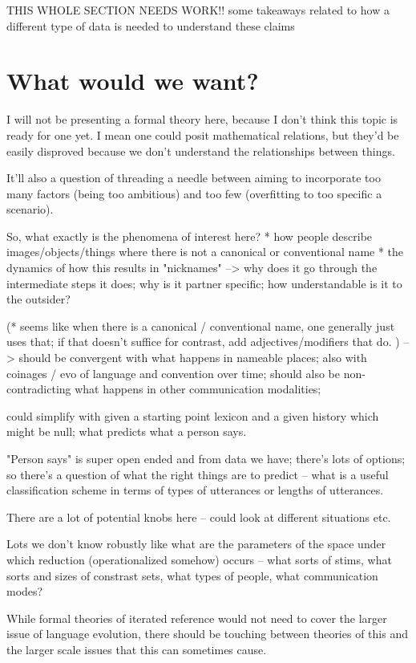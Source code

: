 \documentclass[]{article}
\begin{document}
THIS WHOLE SECTION NEEDS WORK!!
some takeaways related to how a different type of data is needed to understand these claims


	\section{What would we want?}
	
	I will not be presenting a formal theory here, because I don't think this topic is ready for one yet. I mean one could posit mathematical relations, but they'd be easily disproved because we don't understand the relationships between things. 
	
	It'll also a question of threading a needle between aiming to incorporate too many factors (being too ambitious) and too few (overfitting to too specific a scenario). 
	
	So, what exactly is the phenomena of interest here? 
	* how people describe images/objects/things where there is not a canonical or conventional name 
	* the dynamics of how this results in "nicknames" 
	--> why does it go through the intermediate steps it does; why is it partner specific; how understandable is it to the outsider? 
	
	(* seems like when there is a canonical / conventional name, one generally just uses that; if that doesn't suffice for contrast, add adjectives/modifiers that do. )
	-- > should be convergent with what happens in nameable places; also with coinages / evo of language and convention over time; should also be non-contradicting what happens in other communication modalities; 
	
	could simplify with given a starting point lexicon and a given history which might be null; what predicts what a person says. 
	
	"Person says" is super open ended and from data we have; there's lots of options; so there's a question of what the right things are to predict -- what is a useful classification scheme in terms of types of utterances or lengths of utterances. 
	
	There are a lot of potential knobs here -- could look at different situations etc. 
	
	Lots we don't know robustly like what are the parameters of the space under which reduction (operationalized somehow) occurs -- what sorts of stims, what sorts and sizes of constrast sets, what types of people, what communication modes? 
	
	While formal theories of iterated reference would not need to cover the larger issue of language evolution, there should be touching between theories of this and the larger scale issues that this can sometimes cause. 
	
\end{document}
